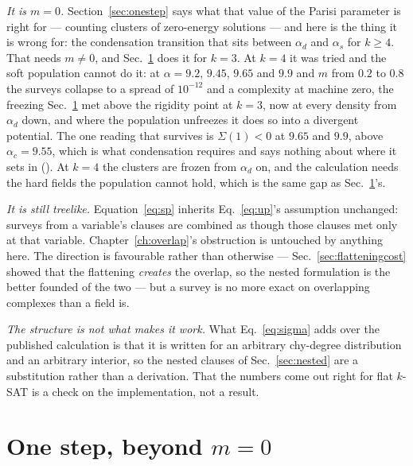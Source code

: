 \emph{It is $m=0$.} Section~\ref{sec:onestep} says what that value of the Parisi
parameter is right for --- counting clusters of zero-energy solutions --- and
here is the thing it is wrong for: the condensation transition that sits between
$\alpha_{d}$ and $\alpha_{s}$ for $k\ge4$. That needs $m\ne0$, and Sec.~\ref{sec:sat-m}
does it for $k=3$. At $k=4$ it was tried and the soft population cannot do
it: at $\alpha=9.2$, $9.45$, $9.65$ and $9.9$ and $m$ from $0.2$ to $0.8$
the surveys collapse to a spread of $10^{-12}$ and a complexity at machine
zero, the freezing Sec.~\ref{sec:sat-m} met above the rigidity point at
$k=3$, now at every density from $\alpha_{d}$ down, and where the
population unfreezes it does so into a divergent potential. The one reading
that survives is $\Sigma(1)<0$ at $9.65$ and $9.9$, above
$\alpha_{c}=9.55$, which is what condensation requires and says nothing
about where it sets in
().
At $k=4$ the clusters are frozen from $\alpha_{d}$ on, and the calculation
needs the hard fields the population cannot hold, which is the same gap as
Sec.~\ref{sec:sat-m}'s.

\emph{It is still treelike.} Equation~\eqref{eq:sp} inherits
Eq.~\eqref{eq:up}'s assumption unchanged: surveys from a variable's clauses are
combined as though those clauses met only at that variable.
Chapter~\ref{ch:overlap}'s obstruction is untouched by anything here. The
direction is favourable rather than otherwise --- Sec.~\ref{sec:flatteningcost}
showed that the flattening \emph{creates} the overlap, so the nested formulation
is the better founded of the two --- but a survey is no more exact on
overlapping complexes than a field is.

\emph{The structure is not what makes it work.} What
Eq.~\eqref{eq:sigma} adds over the published calculation is that it is written
for an arbitrary chy-degree distribution and an arbitrary interior, so the
nested clauses of Sec.~\ref{sec:nested} are a substitution rather than a
derivation. That the numbers come out right for flat $k$-SAT is a check on the
implementation, not a result.

\section{One step, beyond $m=0$}
\label{sec:sat-m}

